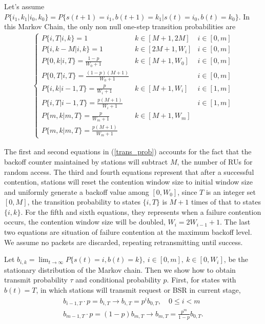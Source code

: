 \documentclass[journal]{IEEEtran}
\begin{document}
Let's assume $P\lbrace i_1, k_1|i_0,k_0\rbrace = P\lbrace s(t+1) = i_1, b(t+1)= k_1|s(t) = i_0, b(t) = k_0\rbrace $. In this Markov Chain, the only non null one-step transition probabilities are 
\begin{align}
\left\lbrace
\begin{array}{lll}
P\lbrace i, T | i, k \rbrace = 1  						& k\in [M+1,2M]			& i \in [0,m]\\ [3pt]
P\lbrace i, k-M | i, k \rbrace = 1  					& k\in [2M+1,W_i]   	& i \in [0,m]\\ [3pt]
P\lbrace 0, k | i, T \rbrace = \frac{1-p}{W_0+1}  		& k\in [M+1,W_0]		& i \in [0,m]\\ [3pt]
P\lbrace 0, T | i, T \rbrace = \frac{(1-p)(M+1)}{W_0+1} &						& i \in [0,m]\\ [3pt]
P\lbrace i, k | i-1, T \rbrace = \frac{p}{W_i+1} 		& k\in [M+1,W_i] 		& i \in [1,m]\\ [3pt]
P\lbrace i, T | i-1, T \rbrace = \frac{p(M+1)}{W_i+1}   &	  					& i \in [1,m]\\ [3pt]
P\lbrace m, k | m, T \rbrace = \frac{p}{W_m+1} 		 	& k\in [M+1,W_m] 		& \\ [3pt]
P\lbrace m, k | m, T \rbrace = \frac{p(M+1)}{W_m+1}
\end{array}
\right.
\label{trans_prob}
\end{align}

The first and second equations in (\ref{trans_prob}) accounts for the fact that the backoff counter maintained by stations will subtract $M$, the number of RUs for random access. 
The third and fourth equations represent that after a successful contention, stations will reset the contention window size to initial window size and uniformly generate a backoff value among $[0,W_0]$, since $T$ is an integer set $[0,M]$, the transition probability to states $\lbrace i, T \rbrace$ is $M+1$ times of that to states $\lbrace i, k \rbrace$. 
For the fifth and sixth equations, they represents when a failure contention occurs, the contention window size will be doubled, $W_i=2W_{i-1}+1$.
The last two equations are situation of failure contention at the maximum backoff level. 
We assume no packets are discarded, repeating retransmitting until success.

Let $b_{i,k} = \lim_{t\rightarrow \infty} P\lbrace s(t) = i, b(t) = k\rbrace,\ i\in [0,m], \ k \in [0,W_i]$, be the stationary distribution of the Markov chain. 
Then we show how to obtain transmit probability $\tau$ and conditional probability $p$.
First,  for states with $b(t) = T$, in which stations will transmit request or BSR in current stage, 
\begin{align}
b_{i-1,T}\cdot p = b_{i,T} 		\rightarrow b_{i,T} = p^i b_{0,T}, \quad 0\leq i < m \nonumber\\
b_{m-1,T}\cdot p = (1-p) b_{m,T}	\rightarrow b_{m,T} = \frac{p^m}{1-p}b_{0,T}.
\label{biT}
\end{align}
\end{document}
